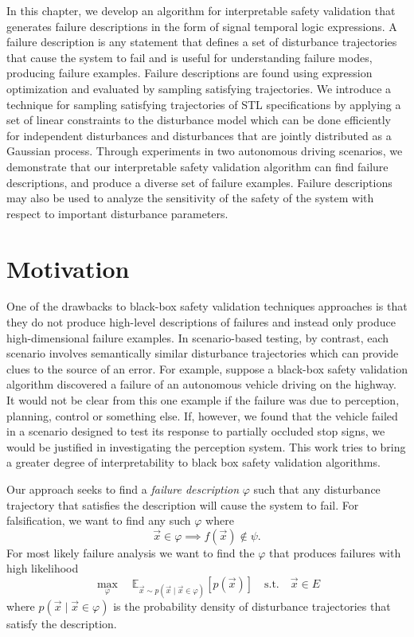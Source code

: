 In this chapter, we develop an algorithm for interpretable safety validation that generates failure descriptions in the form of signal temporal logic expressions. A failure description is any statement that defines a set of disturbance trajectories that cause the system to fail and is useful for understanding failure modes, producing failure examples. Failure descriptions are found using expression optimization and evaluated by sampling satisfying trajectories. We introduce a technique for sampling satisfying trajectories of STL specifications by applying a set of linear constraints to the disturbance model which can be done efficiently for independent disturbances and disturbances that are jointly distributed as a Gaussian process. Through experiments in two autonomous driving scenarios, we demonstrate that our interpretable safety validation algorithm can find failure descriptions, and produce a diverse set of failure examples. Failure descriptions may also be used to analyze the sensitivity of the safety of the system with respect to important disturbance parameters. 

\section{Motivation}

One of the drawbacks to black-box safety validation techniques approaches is that they do not produce high-level descriptions of failures and instead only produce high-dimensional failure examples. In scenario-based testing, by contrast, each scenario involves semantically similar disturbance trajectories which can provide clues to the source of an error. For example, suppose a black-box safety validation algorithm discovered a failure of an autonomous vehicle driving on the highway. It would not be clear from this one example if the failure was due to perception, planning, control or something else. If, however, we found that the vehicle failed in a scenario designed to test its response to partially occluded stop signs, we would be justified in investigating the perception system. This work tries to bring a greater degree of interpretability to black box safety validation algorithms. 

Our approach seeks to find a \emph{failure description} $\varphi$ such that any disturbance trajectory that satisfies the description will cause the system to fail. For falsification, we want to find any such $\varphi$ where
\begin{equation}
    \vec{x} \in \varphi \implies f(\vec{x}) \not \in \psi \text{.}
\end{equation}
For most likely failure analysis we want to find the $\varphi$ that produces failures with high likelihood
\begin{equation}
\max_\varphi \quad \mathbb{E}_{\vec{x} \sim p(\vec{x} \mid \vec{x} \in \varphi)}[p(\vec{x})] \quad\textrm{s.t.}\quad \vec{x} \in E
\end{equation}
where $p(\vec{x} \mid \vec{x} \in \varphi)$ is the probability density of disturbance trajectories that satisfy the description. 

